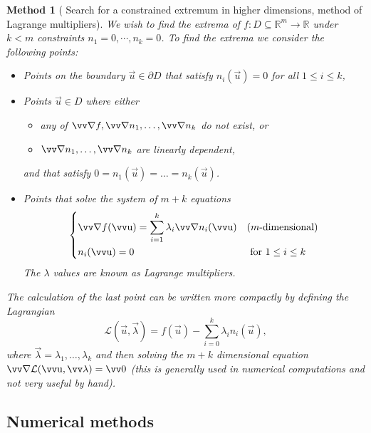 \documentclass[twocolumn, margin=small]{tex/hsrzf}
\theoremstyle{fuvarzf}
\newtheorem{method}{Method}
\begin{document}
\begin{method}[%
    Search for a constrained extremum in higher dimensions,
    method of Lagrange multipliers]
  We wish to find the extrema of \(f: D \subseteq \mathbb{R}^m \to \mathbb{R}\)
  under \(k < m\) constraints \(n_1 = 0, \cdots, n_k = 0\). To find the extrema 
  we consider the following points:
  \begin{itemize}
    \item Points on the boundary \(\vec{u} \in \partial D\) that satisfy
      \(n_i(\vec{u}) = 0\) for all \(1 \leq i \leq k\), 

    \item Points \(\vec{u} \in D\) where either
      \begin{itemize}
        \item any of \(\grad f, \grad n_1, \ldots, \grad n_k\) do not exist, or
        \item \(\grad n_1, \ldots, \grad n_k\) are linearly \emph{dependent},
      \end{itemize}
      and that satisfy \(0 = n_1(\vec{u}) = \ldots = n_k(\vec{u})\).

    \item Points that solve the system of \(m+k\) equations
      \[
        \begin{dcases}
          \grad f(\vec{u}) = \sum_{i = 1}^k \lambda_i \grad n_i(\vec{u})
            & (m\text{-dimensional}) \\
          n_i(\vec{u}) = 0  & \text{ for } 1 \leq i \leq k
        \end{dcases}
      \]
      The \(\lambda\) values are known as \emph{Lagrange multipliers}.
  \end{itemize}
  The calculation of the last point can be written more compactly by defining
  the \emph{Lagrangian}
  \[
    \mathcal{L}(\vec{u}, \vec{\lambda}) 
    = f(\vec{u}) - \sum_{i = 0}^k \lambda_i n_i(\vec{u}),
  \]
  where \(\vec{\lambda} = \lambda_1, \ldots, \lambda_k\) and then solving
  the \(m+k\) dimensional equation \(\grad \mathcal{L}(\vec{u},
  \vec{\lambda}) = \vec{0}\) (this is generally used in numerical
  computations and not very useful by hand).
\end{method}

\subsection{Numerical methods}
\end{document}
